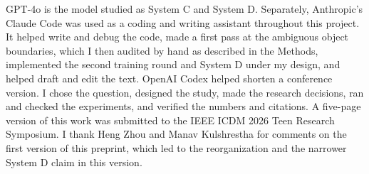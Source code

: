 \documentclass[12pt,letterpaper]{article}
\begin{document}
GPT-4o is the model studied as System C and System D. Separately,
Anthropic's Claude Code was used as a coding and writing assistant
throughout this project. It helped write and debug the code, made a
first pass at the ambiguous object boundaries, which I then audited by
hand as described in the Methods, implemented the second training round
and System D under my design, and helped draft and edit the text. OpenAI
Codex helped shorten a conference version. I chose the question,
designed the study, made the research decisions, ran and checked the
experiments, and verified the numbers and citations. A five-page version
of this work was submitted to the IEEE ICDM 2026 Teen Research
Symposium. I thank Heng Zhou and Manav Kulshrestha for comments on the
first version of this preprint, which led to the reorganization and the
narrower System D claim in this version.
\end{document}

